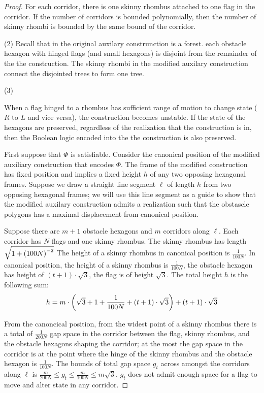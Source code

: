 \begin{proof}
For each corridor, there is one skinny rhombus attached to one flag in the corridor.  If the number of corridors is bounded polynomially, then the number of skinny rhombi is bounded by the same bound of the corridor.

\noindent (2) Recall that in the original auxilary construnction is a forest.
each obstacle hexagon with hinged flags (and small hexagons) is disjoint from the remainder of the the construction. 
The skinny rhombi in the modified auxilary construction connect the disjointed trees to form one tree.

\noindent (3) 

When a flag hinged to a rhombus has sufficient range of motion to change state ($R$ to $L$ and vice versa), the construction becomes unstable.  
If the state of the hexagons are preserved, regardless of the realization that the construction is in, then the Boolean logic encoded into the the construction is also preserved.

 First suppose that $\Phi$ is satisfiable.  
 Consider the canonical position of the modified auxiliary construction that encodes $\Phi$.
 The frame of the modified construction has fixed position and implies a fixed height $h$ of any two opposing hexagonal frames.
Suppose we draw a straight line segment $\ell$ of length $h$ from two opposing hexagonal frames; we will use this line segment as a guide to show that the modified auxilary construction admits a realization such that the obstascle polygons has a maximal displacement from canonical position.

Suppose there are $m+1$ obstacle hexagons and $m$ corridors along $\ell$.
Each corridor has $N$ flags and one skinny rhombus. 
The skinny rhombus  has length $\sqrt{1 + \left( 100N \right)^{-2}}$
The height of a skinny rhombus in canonical position is $\frac{1}{100N}$.
In canonical position, the height of a skinny rhombus is $\frac{1}{100N}$, the obstacle hexagon has height of $ (t+1) \cdot \sqrt{3}$, the flag is of height $\sqrt{3}$.  
The total height $h$ is the following sum:
$$h = m \cdot \left( \sqrt{3} + 1 + \frac{1}{100N} + (t+1) \cdot \sqrt{3} \right) + (t+1) \cdot \sqrt{3}$$

From the canoncical position, from the widest point of a skinny rhombus there is a total of $\frac{1}{200N}$ gap space in the corridor between the flag, skinny rhombus, and the obstacle hexagons shaping the corridor; at the most the gap space in the corridor is at the point where the hinge of the skinny rhombus and the obstacle hexagon is $\frac{1}{100N}$.
The bounds of total gap space $g_t$ across amongst the corridors along $\ell$ is $\frac{m}{200N} \leq g_t \leq \frac{m}{100N} \leq m \sqrt{3}$.
$g_t$ does not admit enough space for a flag to move and alter state in any corridor.




\end{proof}
